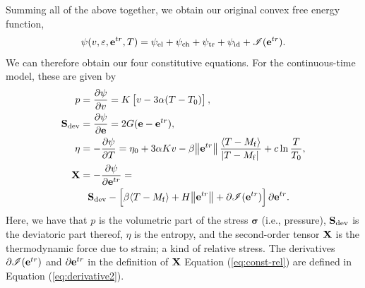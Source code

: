 \begin{multicols}{2}
\begin{itemize}
\end{itemize}
Summing all of the above together, we obtain our original convex free energy function,
\begin{align}
    \psi(v,\varepsilon,\et, T)=\psi_\mathrm{el}+\psi_\mathrm{ch}+\psi_\mathrm{tr}+\psi_\mathrm{id}+\mathscr{I}%
    (\et).
\end{align}
We can therefore obtain our four constitutive equations. For the continuous-time model, these are given by
\begin{align}
\begin{split}
    p&=\pdv{\psi}{v}=K\sbr{v-3\alpha(T-T_0)},\\
    \vb{S}_\mathrm{dev}&=\pdv{\psi}{\vb{e}}=2G(\vb{e}-\et),\\
    \eta&=-\pdv{\psi}{T}=\eta_0+3\alpha Kv - \beta\norm{\et}\frac{\langle T-M_\mathrm{f}\rangle}{\abs{T-M_\mathrm{f}}}+c\ln\frac{T}{T_0},\\
    \vb{X}&=-\pdv{\psi}{\et}=\\
    &\phantom{=}\vb{S}_\mathrm{dev}-\sbr{\beta\langle T-M_\mathrm{f}\rangle +H\norm{\et}+\partial \mathscr{I}%
    (\et)}\partial\et.\\
\end{split}\label{eq:const-rel}
\end{align}
Here, we have that $p$ is the volumetric part of the stress $\bm{\sigma}$ (i.e., pressure), $\vb{S}_\mathrm{dev}$ is the deviatoric part thereof, $\eta$ is the entropy, and the second-order tensor $\vb{X}$ is the thermodynamic force due to strain; a kind of relative stress. The derivatives $\partial \mathscr{I}(\vb{e}^{tr})$ and $\partial\vb{e}^{tr}$ in the definition of $\vb{X}$ Equation (\ref{eq:const-rel})  are defined in Equation (\ref{eq:derivative2}).

\end{multicols}
